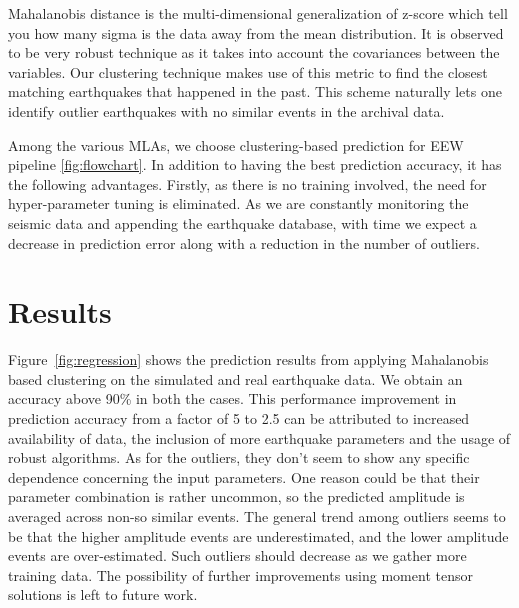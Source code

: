 \documentclass[reprint, prl, aps, showpacs]{revtex4-1}
\begin{document}
Mahalanobis distance is the multi-dimensional generalization of z-score which tell you how many sigma is the data away from the mean distribution. It is observed to be very robust technique as it takes into account the covariances between the variables. Our clustering technique makes use of this metric to find the closest matching earthquakes that happened in the past. This scheme naturally lets one identify outlier earthquakes with no similar events in the archival data.

Among the various MLAs, we choose clustering-based prediction for EEW pipeline \ref{fig:flowchart}. In addition to having the best prediction accuracy, it has the following advantages.  Firstly, as there is no training involved, the need for hyper-parameter tuning is eliminated. As we are constantly monitoring the seismic data and appending the earthquake database, with time we expect a decrease in prediction error along with a reduction in the number of outliers. 


\section{Results}\label{sec:results}

Figure~\ref{fig:regression} shows the prediction results from applying Mahalanobis based clustering on the simulated and real earthquake data. We obtain an accuracy above 90\% in both the cases. This performance improvement in prediction accuracy from a factor of 5 to 2.5 can be attributed to increased availability of data, the inclusion of more earthquake parameters and the usage of robust algorithms.  As for the outliers, they don't seem to show any specific dependence concerning the input parameters. One reason could be that their parameter combination is rather uncommon, so the predicted amplitude is averaged across non-so similar events. The general trend among outliers seems to be that the higher amplitude events are underestimated, and the lower amplitude events are over-estimated. Such outliers should decrease as we gather more training data. The possibility of further improvements using moment tensor solutions is left to future work.
\end{document}
